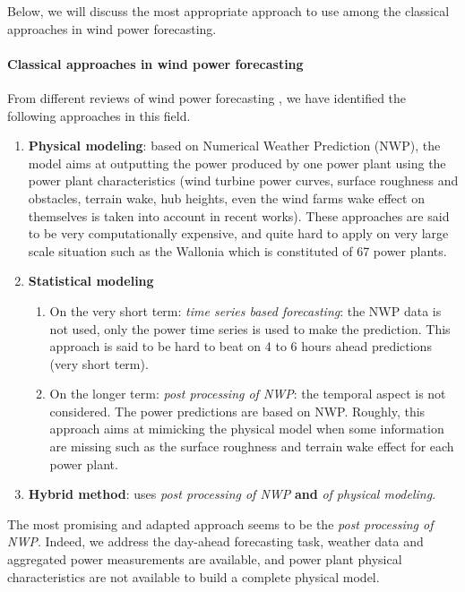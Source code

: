 \documentclass[a4paper, 12pt]{article}
\begin{document}
	Below, we will discuss the most appropriate approach to use among the classical approaches in wind power forecasting.
	
	\paragraph{Classical approaches in wind power forecasting}
		
	From different reviews of wind power forecasting \parencite{sweeney2019future, messner2020windpower}, we have identified the following approaches in this field.

	\begin{enumerate}[label=\arabic*]

		\item \textbf{Physical modeling}: based on Numerical Weather Prediction (NWP), the model aims at outputting the power produced by one power plant using the power plant characteristics (wind turbine power curves, surface roughness and obstacles, terrain wake, hub heights, even the wind farms wake effect on themselves is taken into account in recent works). These approaches are said to be very computationally expensive, and quite hard to apply on very large scale situation such as the Wallonia which is constituted of 67 power plants. 

		\item \textbf{Statistical modeling}
		\begin{enumerate}[label=\alph*.]
			\item On the very short term: \emph{time series based forecasting}: the NWP data is not used, only the power time series is used to make the prediction. This approach is said to be hard to beat on 4 to 6 hours ahead predictions (very short term).

			\item On the longer term: \emph{post processing of NWP}: the temporal aspect is not considered. The power predictions are based on NWP. Roughly, this approach aims at mimicking the physical model when some information are missing such as the surface roughness and terrain wake effect for each power plant. 
		\end{enumerate}

		\item \textbf{Hybrid method}: uses \emph{post processing of NWP} \textbf{and} \emph{of physical modeling}.
	\end{enumerate}

	The most promising and adapted approach seems to be the \emph{post processing of NWP}. Indeed, we address the day-ahead forecasting task, weather data and aggregated power measurements are available, and power plant physical characteristics are not available to build a complete physical model.
\end{document}
